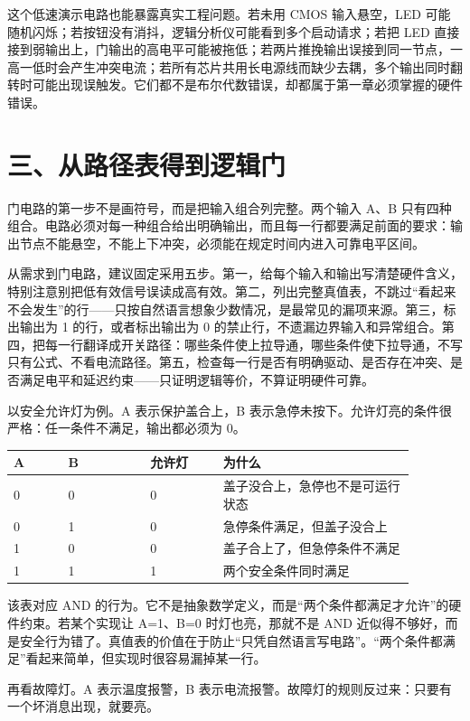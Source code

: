 这个低速演示电路也能暴露真实工程问题。若未用 CMOS 输入悬空，LED 可能随机闪烁；若按钮没有消抖，逻辑分析仪可能看到多个启动请求；若把 LED 直接接到弱输出上，门输出的高电平可能被拖低；若两片推挽输出误接到同一节点，一高一低时会产生冲突电流；若所有芯片共用长电源线而缺少去耦，多个输出同时翻转时可能出现误触发。它们都不是布尔代数错误，却都属于第一章必须掌握的硬件错误。

\section{三、从路径表得到逻辑门}

门电路的第一步不是画符号，而是把输入组合列完整。两个输入 A、B 只有四种组合。电路必须对每一种组合给出明确输出，而且每一行都要满足前面的要求：输出节点不能悬空，不能上下冲突，必须能在规定时间内进入可靠电平区间。

从需求到门电路，建议固定采用五步。第一，给每个输入和输出写清楚硬件含义，特别注意别把低有效信号误读成高有效。第二，列出完整真值表，不跳过“看起来不会发生”的行——只按自然语言想象少数情况，是最常见的漏项来源。第三，标出输出为 1 的行，或者标出输出为 0 的禁止行，不遗漏边界输入和异常组合。第四，把每一行翻译成开关路径：哪些条件使上拉导通，哪些条件使下拉导通，不写只有公式、不看电流路径。第五，检查每一行是否有明确驱动、是否存在冲突、是否满足电平和延迟约束——只证明逻辑等价，不算证明硬件可靠。

以安全允许灯为例。A 表示保护盖合上，B 表示急停未按下。允许灯亮的条件很严格：任一条件不满足，输出都必须为 0。

\begin{longtable}{L{0.12\linewidth}L{0.18\linewidth}L{0.16\linewidth}L{0.42\linewidth}}
\toprule
A & B & 允许灯 & 为什么 \\
 & 0 & 0 & 盖子没合上，急停也不是可运行状态 \\
0 & 1 & 0 & 急停条件满足，但盖子没合上 \\
1 & 0 & 0 & 盖子合上了，但急停条件不满足 \\
1 & 1 & 1 & 两个安全条件同时满足 \\
\bottomrule
\end{longtable}

该表对应 AND 的行为。它不是抽象数学定义，而是“两个条件都满足才允许”的硬件约束。若某个实现让 A=1、B=0 时灯也亮，那就不是 AND 近似得不够好，而是安全行为错了。真值表的价值在于防止“只凭自然语言写电路”。“两个条件都满足”看起来简单，但实现时很容易漏掉某一行。

再看故障灯。A 表示温度报警，B 表示电流报警。故障灯的规则反过来：只要有一个坏消息出现，就要亮。

